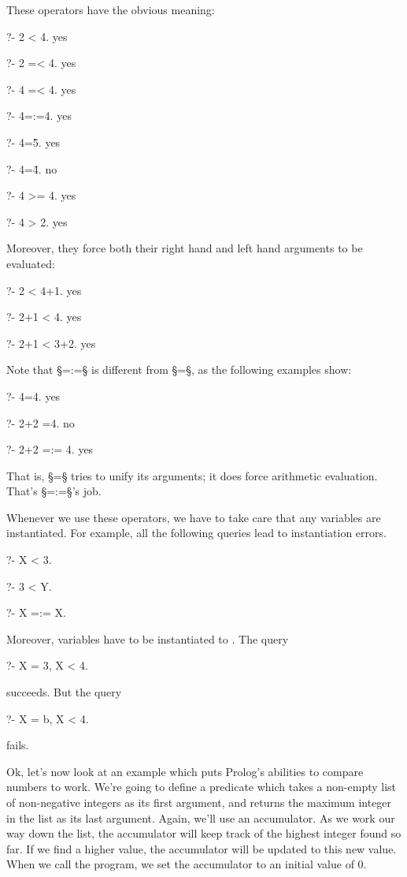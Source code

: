 These operators have the obvious meaning:
\begin{LPNcodedisplay}
?- 2 < 4.
yes

?- 2 =< 4.
yes

?- 4 =< 4.
yes

?- 4=:=4.
yes

?- 4=\=5.
yes

?- 4=\=4.
no

?- 4 >= 4.
yes

?- 4 > 2.
yes
\end{LPNcodedisplay}


Moreover, they force both their right hand and left hand arguments to
be evaluated:
\begin{LPNcodedisplay}
?- 2 < 4+1.
yes

?- 2+1 < 4.
yes

?- 2+1 < 3+2.
yes
\end{LPNcodedisplay}


Note that §=:=§ is different from §=§, as the following examples show:
\begin{LPNcodedisplay}
?- 4=4.
yes

?- 2+2 =4.
no

?- 2+2 =:= 4.
yes
\end{LPNcodedisplay}
That is, §=§ tries to unify its arguments; it does 
force arithmetic evaluation.  That's §=:=§'s job.

Whenever we use these operators, we have to take care that any
variables are instantiated.  For example, all the following queries
lead to instantiation errors.
\begin{LPNcodedisplay}
?- X < 3.

?- 3 < Y.

?- X =:= X.
\end{LPNcodedisplay}
Moreover, variables have to be instantiated to .
The query
\begin{LPNcodedisplay}
?- X = 3, X < 4.
\end{LPNcodedisplay}
succeeds. But the query
\begin{LPNcodedisplay}
?- X = b, X < 4.
\end{LPNcodedisplay}
fails.

Ok, let's now look at an example which puts Prolog's abilities to
compare numbers to work.  We're going to define a predicate which
takes  a non-empty list of non-negative integers as its first
argument, and returns the maximum integer in the list as its last
argument.  Again, we'll use an accumulator.  As we work our way down
the list, the accumulator will keep track of the highest integer found
so far.  If we find a higher value, the accumulator will be updated to
this new value.  When we call the program, we set the accumulator to an
initial value of 0.

